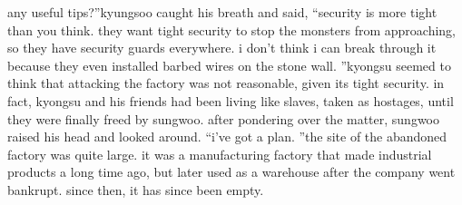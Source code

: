  any useful tips?”kyungsoo caught his breath and said, “security is more tight than you think.
 they want tight security to stop the monsters from approaching, so they have security guards everywhere.
 i don’t think i can break through it because they even installed barbed wires on the stone wall.
”kyongsu seemed to think that attacking the factory was not reasonable, given its tight security.
in fact, kyongsu and his friends had been living like slaves, taken as hostages, until they were finally freed by sungwoo.
after pondering over the matter, sungwoo raised his head and looked around.
“i’ve got a plan.
”the site of the abandoned factory was quite large.
 it was a manufacturing factory that made industrial products a long time ago, but later used as a warehouse after the company went bankrupt.
 since then, it has since been empty.

